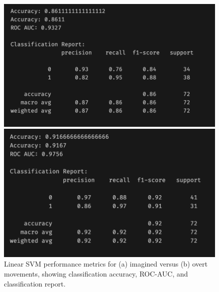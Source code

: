 \documentclass[
  letterpaper,
  DIV=11,
  numbers=noendperiod]{scrartcl}
\begin{document}
\begin{figure}

\begin{minipage}{0.50\linewidth}

\includegraphics[width=1\textwidth,height=\textheight]{figures/linear_result_imagined.png}

\end{minipage}%
%
\begin{minipage}{0.50\linewidth}

\includegraphics[width=1\textwidth,height=\textheight]{figures/linear_result_overt.png}

\end{minipage}%

\caption{\label{fig-linearSVM}Linear SVM performance metrics for (a)
imagined versus (b) overt movements, showing classification accuracy,
ROC-AUC, and classification report.}

\end{figure}%
\end{document}
